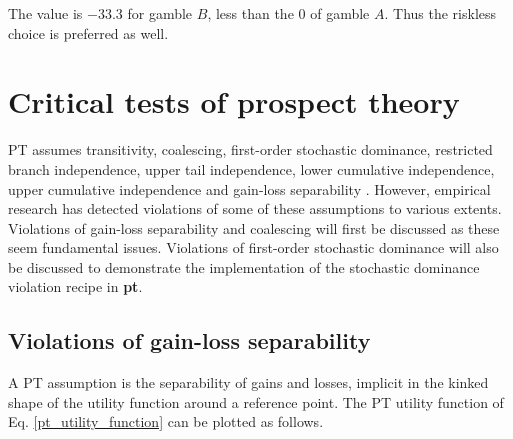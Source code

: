 \documentclass{article}\usepackage[]{graphicx}\usepackage[]{color}
\begin{document}
The value is $-33.3$ for gamble $B$, less than the $0$ of gamble $A$. Thus the riskless choice is preferred as well.

\section{Critical tests of prospect theory}

PT assumes transitivity, coalescing, first-order stochastic dominance, restricted branch independence,
upper tail independence, lower cumulative independence, upper cumulative independence and gain-loss separability \citep*{Birnbaum_2008}.
However, empirical research has detected violations of some of these assumptions to various extents. Violations of gain-loss separability and coalescing will first be discussed as these seem fundamental issues. Violations of first-order stochastic dominance will also be discussed to demonstrate the implementation of the \citet[][p. 74]{Birnbaum_1997} stochastic dominance violation recipe in {\bf pt}.

\subsection{Violations of gain-loss separability}

A PT assumption is the separability of gains and losses, implicit in the kinked shape of the utility function around a reference point.
The PT utility function of Eq. \eqref{pt_utility_function} can be plotted as follows.
\end{document}
